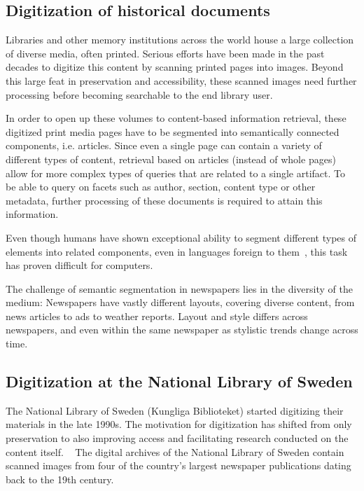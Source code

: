 \documentclass[oneside, english, bibtex]{kththesis}
\begin{document}
\subsection{Digitization of historical documents}

Libraries and other memory institutions across the world house a large collection of diverse media, often printed. Serious efforts have been made in the past decades to digitize this content by scanning printed pages into images. Beyond this large feat in preservation and accessibility, these scanned images need further processing before becoming searchable to the end library user.

In order to open up these volumes to content-based information retrieval, these digitized print media pages have to be segmented into semantically connected components, i.e. articles. Since even a single page can contain a variety of different types of content, retrieval based on articles (instead of whole pages) allow for more complex types of queries that are related to a single artifact. To be able to query on facets such as author, section, content type or other metadata, further processing of these documents is required to attain this information.

Even though humans have shown exceptional ability to segment different types of elements into related components, even in languages foreign to them~\cite{8270006}, this task has proven difficult for computers.

The challenge of semantic segmentation in newspapers lies in the diversity of the medium: Newspapers have vastly different layouts, covering diverse content, from news articles to ads to weather reports. Layout and style differs across newspapers, and even within the same newspaper as stylistic trends change across time.


\subsection{Digitization at the National Library of Sweden}

The National Library of Sweden (Kungliga Biblioteket) started digitizing their materials in the late 1990s. The motivation for digitization has shifted from only preservation to also improving access and facilitating research conducted on the content itself. ~\cite{Rekathati_2020} The digital archives of the National Library of Sweden contain scanned images from four of the country’s largest newspaper publications dating back to the 19th century.
\end{document}
